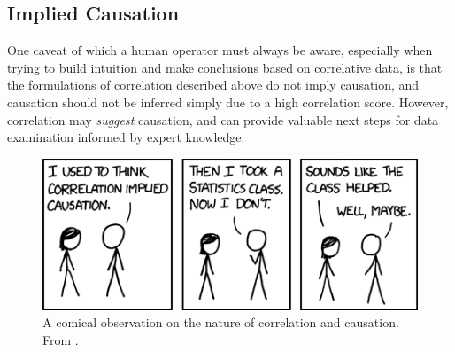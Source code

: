 \subsection{Implied Causation}

One caveat of which a human operator must always be aware, especially when trying to build intuition and make conclusions based on correlative data, is that the formulations of correlation described above do not imply causation, and causation should not be inferred simply due to a high correlation score. However, correlation may \textit{suggest} causation, and can provide valuable next steps for data examination informed by expert knowledge.

\begin{figure}[h]
\centering
    \includegraphics[width=0.5\columnwidth]{images/xkcd_correlation.png}
    \caption{A comical observation on the nature of correlation and causation. From \cite{xkcd_correlation}.}
    \label{fig:xkcd_correction}
\end{figure}








